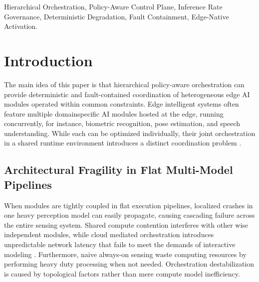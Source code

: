 \documentclass[conference]{IEEEtran}
\begin{document}
\begin{IEEEkeywords}
Hierarchical Orchestration, Policy-Aware Control Plane, Inference Rate Governance, Deterministic Degradation, Fault Containment, Edge-Native Activation.
\end{IEEEkeywords}

\section{Introduction}

The main idea of this paper is that hierarchical policy-aware orchestration can provide deterministic and fault-contained coordination of heterogeneous edge AI modules operated within common constraints. Edge intelligent systems often feature multiple domainspecific AI modules hosted at the edge, running concurrently, for instance, biometric recognition, pose estimation, and speech understanding. While each can be optimized individually, their joint orchestration in a shared runtime environment introduces a distinct coordination problem \cite{b14, b21}.

\subsection{Architectural Fragility in Flat Multi-Model Pipelines}
When modules are tightly coupled in flat execution pipelines, localized crashes in one heavy perception model can easily propagate, causing cascading failure across the entire sensing system. Shared compute contention interferes with other wise independent modules, while cloud mediated orchestration introduces unpredictable network latency that fails to meet the demands of interactive modeling \cite{b4, b15}. Furthermore, naive always-on sensing waste computing resources by performing heavy duty processing when not needed. Orchestration destabilization is caused by topological factors rather than mere compute model inefficiency.
\end{document}
